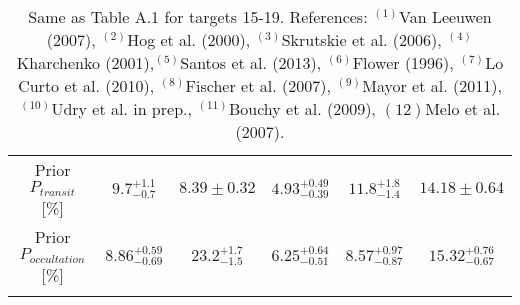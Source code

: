 \documentclass[traditabstract]{aa}
\begin{document}
\begin{appendix}
\begin{table*}
\begin{center}
{\begin{tabular}{cccccc}
Prior $P_{transit}$ [\%]           & $9.7_{-0.7}^{+1.1}$       & $8.39 \pm 0.32$                   & $4.93_{-0.39}^{+0.49}$     & $11.8 _{-1.4}^{+1.8}$                              & $14.18 \pm 0.64$ \\ \noalign {\smallskip} 
Prior $P_{occultation}$ [\%]    & $8.86_{-0.69}^{+0.59}$            & $23.2_{-1.5}^{+1.7}$                  &  $6.25_{-0.51}^{+0.64}$      & $8.57_{-0.87}^{+0.97}$                   & $15.32_{-0.67}^{+0.76}$   \\ \noalign {\smallskip} 
\hline \noalign {\smallskip} 
\end{tabular}
}
\end{center}
\caption{Same as Table A.1 for targets 15-19. 
 References: $^{(1)}$Van Leeuwen (2007), $^{(2)}$Hog et al. (2000), $^{(3)}$Skrutskie et al. (2006), $^{(4)}$Kharchenko (2001),$^{(5)}$Santos et al. (2013), $^{(6)}$Flower (1996), $^{(7)}$Lo Curto et al. (2010), $^{(8)}$Fischer et al. (2007), $^{(9)}$Mayor et al. (2011), $^{(10)}$Udry et al. in prep., $^{(11)}$Bouchy et al. (2009), ${(12)}$Melo et al. (2007).}
\end{table*}


\end{appendix}
\end{document}
